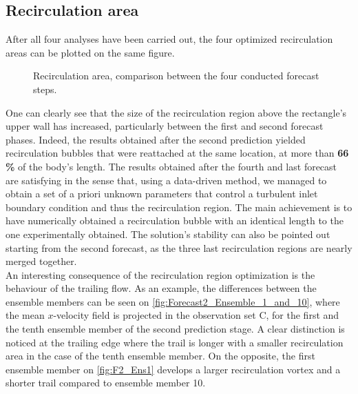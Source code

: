 \documentclass[12pt,twoside]{report}
\begin{document}
\subsection{Recirculation area}
After all four analyses have been carried out, the four optimized recirculation areas can be plotted on the same figure. 

\begin{figure}[h!]
	\centering
	
	\caption{Recirculation area, comparison between the four conducted forecast steps.}
	\label{fig:recirculation_4Forecasts}
\end{figure}

One can clearly see that the size of the recirculation region above the rectangle's upper wall has increased, particularly between the first and second forecast phases. Indeed, the results obtained after the second prediction yielded recirculation bubbles that were reattached at the same location, at more than \textbf{66\,\%} of the body's length. The results obtained after the fourth and last forecast are satisfying in the sense that, using a data-driven method, we managed to obtain a set of a priori unknown parameters that control a turbulent inlet boundary condition and thus the recirculation region. The main achievement is to have numerically obtained a recirculation bubble with an identical length to the one experimentally obtained. The solution's stability can also be pointed out starting from the second forecast, as the three last recirculation regions are nearly merged together. \\

An interesting consequence of the recirculation region optimization is the behaviour of the trailing flow. As an example, the differences between the ensemble members can be seen on \autoref{fig:Forecast2_Ensemble_1_and_10}, where the mean $x$-velocity field is projected in the observation set C, for the first and the tenth ensemble member of the second prediction stage. A clear distinction is noticed at the trailing edge where the trail is longer with a smaller recirculation area in the case of the tenth ensemble member. On the opposite, the first ensemble member on \autoref{fig:F2_Ens1} develops a larger recirculation vortex and a shorter trail compared to ensemble member 10. 

\clearpage
\end{document}
